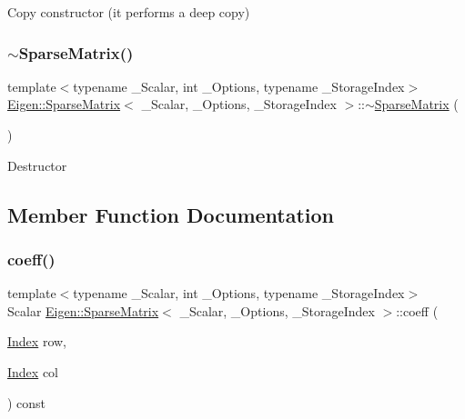 Copy constructor (it performs a deep copy) \mbox{\label{class_eigen_1_1_sparse_matrix_a36835ee4f8e5f273087910ec8063a4f6}} 
\subsubsection{\texorpdfstring{$\sim$SparseMatrix()}{~SparseMatrix()}}
{\footnotesize\ttfamily template$<$typename \+\_\+\+Scalar, int \+\_\+\+Options, typename \+\_\+\+Storage\+Index$>$ \\
\mbox{\hyperlink{class_eigen_1_1_sparse_matrix}{Eigen\+::\+Sparse\+Matrix}}$<$ \+\_\+\+Scalar, \+\_\+\+Options, \+\_\+\+Storage\+Index $>$\+::$\sim$\mbox{\hyperlink{class_eigen_1_1_sparse_matrix}{Sparse\+Matrix}} (\begin{DoxyParamCaption}{ }\end{DoxyParamCaption})\hspace{0.3cm}{\ttfamily [inline]}}

Destructor 

\subsection{Member Function Documentation}
\mbox{\label{class_eigen_1_1_sparse_matrix_a54adf6aa526045f37e67e352da8fd105}} 
\subsubsection{\texorpdfstring{coeff()}{coeff()}}
{\footnotesize\ttfamily template$<$typename \+\_\+\+Scalar, int \+\_\+\+Options, typename \+\_\+\+Storage\+Index$>$ \\
Scalar \mbox{\hyperlink{class_eigen_1_1_sparse_matrix}{Eigen\+::\+Sparse\+Matrix}}$<$ \+\_\+\+Scalar, \+\_\+\+Options, \+\_\+\+Storage\+Index $>$\+::coeff (\begin{DoxyParamCaption}\item[{\mbox{\hyperlink{struct_eigen_1_1_eigen_base_a554f30542cc2316add4b1ea0a492ff02}{Index}}}]{row,  }\item[{\mbox{\hyperlink{struct_eigen_1_1_eigen_base_a554f30542cc2316add4b1ea0a492ff02}{Index}}}]{col }\end{DoxyParamCaption}) const\hspace{0.3cm}{\ttfamily [inline]}}

